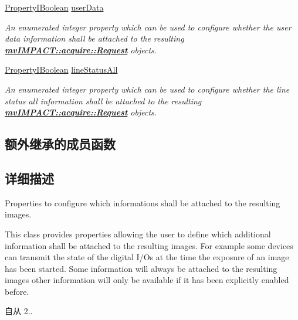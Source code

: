 \begin{DoxyCompactItemize}
\hyperlink{group___common_interface_ga44f9437e24b21b6c93da9039ec6786aa}{Property\+I\+Boolean} \hyperlink{classmv_i_m_p_a_c_t_1_1acquire_1_1_request_info_configuration_a5a66a2fca455e36238a27d0e062a154c}{user\+Data}
\begin{DoxyCompactList}\small\item\em An enumerated integer property which can be used to configure whether the user data information shall be attached to the resulting {\bfseries \hyperlink{classmv_i_m_p_a_c_t_1_1acquire_1_1_request}{mv\+I\+M\+P\+A\+C\+T\+::acquire\+::\+Request}} objects. \end{DoxyCompactList}\item 
\hyperlink{group___common_interface_ga44f9437e24b21b6c93da9039ec6786aa}{Property\+I\+Boolean} \hyperlink{classmv_i_m_p_a_c_t_1_1acquire_1_1_request_info_configuration_a816d920d6ef0144757984568b60d0064}{line\+Status\+All}
\begin{DoxyCompactList}\small\item\em An enumerated integer property which can be used to configure whether the line status all information shall be attached to the resulting {\bfseries \hyperlink{classmv_i_m_p_a_c_t_1_1acquire_1_1_request}{mv\+I\+M\+P\+A\+C\+T\+::acquire\+::\+Request}} objects. \end{DoxyCompactList}\end{DoxyCompactItemize}
\subsection*{额外继承的成员函数}


\subsection{详细描述}
Properties to configure which informations shall be attached to the resulting images. 

This class provides properties allowing the user to define which additional information shall be attached to the resulting images. For example some devices can transmit the state of the digital I/\+Os at the time the exposure of an image has been started. Some information will always be attached to the resulting images other information will only be available if it has been explicitly enabled before.

\begin{DoxySince}{自从}
2.. 
\end{DoxySince}


